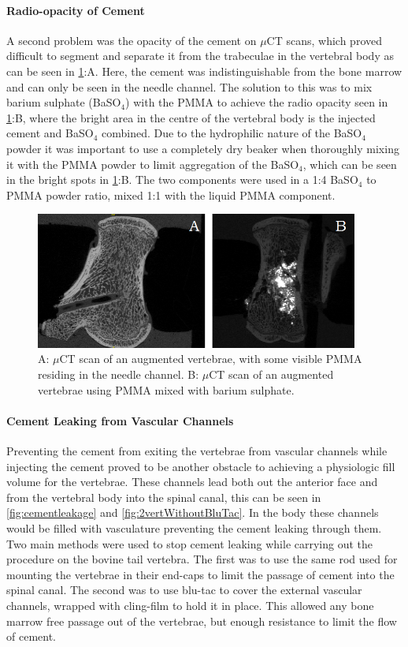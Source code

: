 \paragraph{Radio-opacity of Cement} A second problem was the opacity of the
cement on $\mu$CT scans, which proved difficult to segment and separate it from
the trabeculae in the vertebral body as can be seen in
\cref{fig:withWithoutBaSO4}:A. Here, the cement was indistinguishable from the
bone marrow and can only be seen in the needle channel. The solution to this
was to mix barium sulphate (BaSO$_4$) with the PMMA to achieve the radio
opacity seen in \cref{fig:withWithoutBaSO4}:B, where the bright area in the
centre of the vertebral body is the injected cement and BaSO$_4$ combined. Due
to the hydrophilic nature of the BaSO$_4$ powder it was important to use a
completely dry beaker when thoroughly mixing it with the PMMA powder to limit
aggregation of the BaSO$_4$, which can be seen in the bright spots in
\cref{fig:withWithoutBaSO4}:B. The two components were used in a 1:4 BaSO$_4$
to PMMA powder ratio, mixed 1:1 with the liquid PMMA component.

\begin{figure}[ht!]
\centering
\includegraphics[width=4.18472in]{images/withWithoutBaSo4.png}
\caption{A: $\mu$CT scan of an augmented vertebrae, with some visible PMMA residing in the needle channel. B: $\mu$CT scan of an augmented vertebrae using PMMA mixed with barium sulphate.}
\label{fig:withWithoutBaSO4}
\end{figure}
\paragraph{Cement Leaking from Vascular Channels} Preventing the cement from
exiting the vertebrae from vascular channels while injecting the cement proved
to be another obstacle to achieving a physiologic fill volume for the
vertebrae. These channels lead both out the anterior face and from the
vertebral body into the spinal canal, this can be seen in
\cref{fig:cementleakage} and \ref{fig:2vertWithoutBluTac}. In the body these
channels would be filled with vasculature preventing the cement leaking through
them. Two main methods were used to stop cement leaking while carrying out the
procedure on the bovine tail vertebra. The first was to use the same rod used
for mounting the vertebrae in their end-caps to limit the passage of cement
into the spinal canal. The second was to use blu-tac to cover the external
vascular channels, wrapped with cling-film to hold it in place. This allowed
any bone marrow free passage out of the vertebrae, but enough resistance to
limit the flow of cement.

